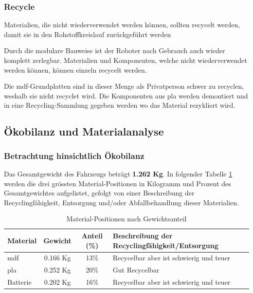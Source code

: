 \subsubsection{Recycle}

Materialien, die nicht wiederverwendet werden können, sollten
recycelt werden, damit sie in den Rohstoffkreislauf zurückgeführt werden

Durch die modulare Bauweise ist der Roboter nach Gebrauch auch wieder komplett zerlegbar. Materialien und Komponenten, welche nicht wiederverwendet werden können, können einzeln recycelt werden.

Die \acrshort{mdf}-Grundplatten sind in dieser Menge als Privatperson schwer zu recyclen, weshalb sie nicht recyclet wird. Die Komponenten aus \acrshort{pla} werden demontiert und in eine Recycling-Sammlung gegeben werden wo das Material rezykliert wird.

\subsection{Ökobilanz und Materialanalyse}

\subsubsection{Betrachtung hinsichtlich Ökobilanz}
Das Gesamtgewicht des Fahrzeugs beträgt \textbf{1.262 Kg}. In folgender Tabelle \ref{tab:kritische-mat} werden die drei grössten Material-Positionen in Kilogramm und Prozent des Gesamtgewichtes aufgelistet, gefolgt von einer Beschreibung der Recyclingfähigkeit, Entsorgung und/oder Abfallbehandlung dieser Materialien.

\begin{table}[h]

    \centering
    \caption{Material-Positionen nach Gewichtsanteil}
    \begin{tabular}{l c c p{10cm}}
    \toprule
    Material & Gewicht  & Anteil (\%) & Beschreibung der Recyclingfähigkeit/Entsorgung \\
    \midrule
    \acrshort{mdf} & 0.166 Kg & 13\% & Recycelbar aber ist schwierig und teuer \cite{support-2024}\\
    \acrshort{pla} & 0.252 Kg & 20\% & Gut Recycelbar \\
    Batterie & 0.202 Kg & 16\% & Recycelbar aber ist schwierig und teuer\cite{regan-2023} \\
    \bottomrule
    \end{tabular}
    \label{tab:kritische-mat}
\end{table}



